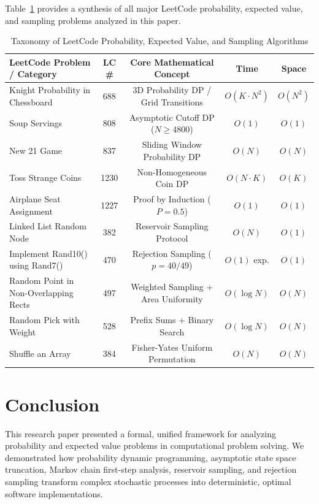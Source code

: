 \documentclass[10pt,journal,compsoc,onecolumn]{IEEEtran}
\begin{document}
Table~\ref{tab:leetcode-probability-taxonomy} provides a synthesis of all major LeetCode probability, expected value, and sampling problems analyzed in this paper.

\begin{table}[htbp]
\centering
\caption{Taxonomy of LeetCode Probability, Expected Value, and Sampling Algorithms}
\label{tab:leetcode-probability-taxonomy}
\begin{tabular}{lcccc}
\toprule
\textbf{LeetCode Problem / Category} & \textbf{LC \#} & \textbf{Core Mathematical Concept} & \textbf{Time} & \textbf{Space} \\
\midrule
Knight Probability in Chessboard & 688 & 3D Probability DP / Grid Transitions & $O(K \cdot N^2)$ & $O(N^2)$ \\
Soup Servings & 808 & Asymptotic Cutoff DP ($N \ge 4800$) & $O(1)$ & $O(1)$ \\
New 21 Game & 837 & Sliding Window Probability DP & $O(N)$ & $O(N)$ \\
Toss Strange Coins & 1230 & Non-Homogeneous Coin DP & $O(N \cdot K)$ & $O(K)$ \\
Airplane Seat Assignment & 1227 & Proof by Induction ($P = 0.5$) & $O(1)$ & $O(1)$ \\
Linked List Random Node & 382 & Reservoir Sampling Protocol & $O(N)$ & $O(1)$ \\
Implement Rand10() using Rand7() & 470 & Rejection Sampling ($p = 40/49$) & $O(1)$ exp. & $O(1)$ \\
Random Point in Non-Overlapping Rects & 497 & Weighted Sampling + Area Uniformity & $O(\log N)$ & $O(N)$ \\
Random Pick with Weight & 528 & Prefix Sums + Binary Search & $O(\log N)$ & $O(N)$ \\
Shuffle an Array & 384 & Fisher-Yates Uniform Permutation & $O(N)$ & $O(N)$ \\
\bottomrule
\end{tabular}
\end{table}

\section{Conclusion}
\label{sec:conclusion}

This research paper presented a formal, unified framework for analyzing probability and expected value problems in computational problem solving. We demonstrated how probability dynamic programming, asymptotic state space truncation, Markov chain first-step analysis, reservoir sampling, and rejection sampling transform complex stochastic processes into deterministic, optimal software implementations.
\end{document}
